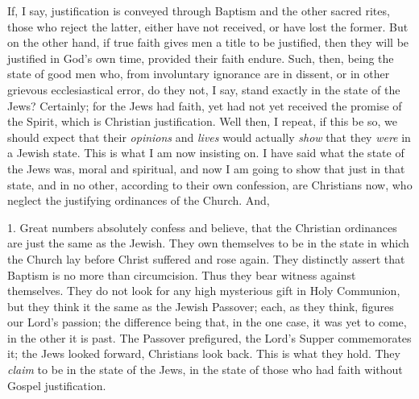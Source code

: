 If, I say, justification is conveyed through Baptism and the other
sacred rites, those who reject the latter, either have not received,
or have lost the former. But on the other hand, if true faith gives
men a title to be justified, then they will be justified in God's own
time, provided their faith endure. Such, then, being the state of good
men who, from involuntary ignorance are in dissent, or in other
grievous ecclesiastical error, do they not, I say, stand exactly in
the state of the Jews? Certainly; for the Jews had faith, yet had not
yet received the promise of the Spirit, which is Christian
justification. Well then, I repeat, if this be so, we should expect
that their \emph{opinions} and \emph{lives} would actually \emph{show}
that they \emph{were} in a Jewish state. This is what I am now
insisting on. I have said what the state of the Jews was, moral and
spiritual, and now I am going to show that just in that state, and in
no other, according to their own confession, are Christians now, who
neglect the justifying ordinances of the Church. And,

1. Great numbers absolutely confess and believe, that the Christian
ordinances are just the same as the Jewish. They own themselves to be
in the state in which the Church lay before Christ suffered and rose
again. They distinctly assert that Baptism is no more than
circumcision. Thus they bear witness against themselves. They do not
look for any high mysterious gift in Holy Communion, but they think it
the same as the Jewish Passover; each, as they think, figures our
Lord's passion; the difference being that, in the one case, it was yet
to come, in the other it is past. The Passover prefigured, the Lord's
Supper commemorates it; the Jews looked forward, Christians look back.
This is what they hold. They \emph{claim} to be in the state of the
Jews, in the state of those who had faith without Gospel
justification.

